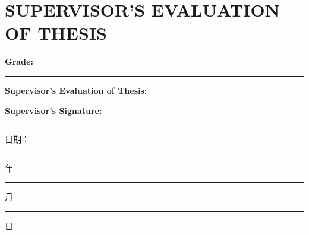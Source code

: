 

\chapter*{SUPERVISOR'S EVALUATION OF THESIS}

\vspace{1cm}

\noindent
\textbf{Grade:} \rule{6cm}{0.4pt}

\vspace{2cm}

\noindent
\textbf{Supervisor's Evaluation of Thesis:}

\vspace{6cm}

\noindent
\textbf{Supervisor's Signature:} \rule{5cm}{0.4pt}

\vspace{1cm}

\hfill 日期：\rule{1.5cm}{0.4pt} 年 \rule{1cm}{0.4pt} 月 \rule{1cm}{0.4pt} 日
